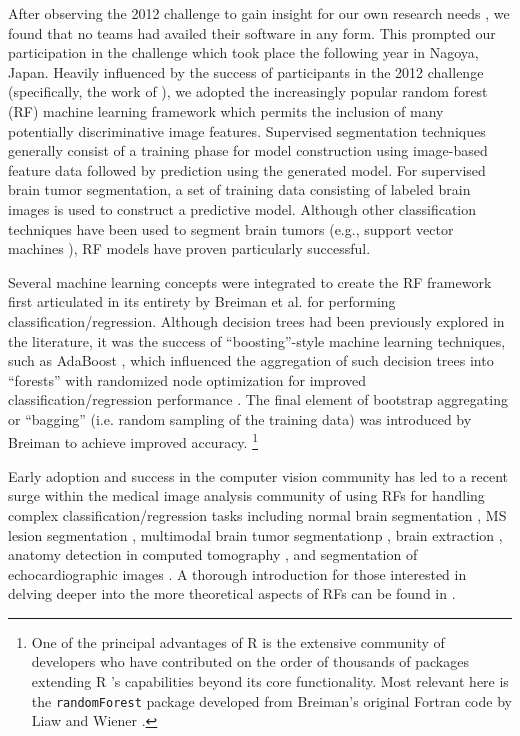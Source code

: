 \documentclass[preprint,authoryear,review,12pt]{elsarticle}
\begin{document}
After observing the 2012 challenge to gain insight for our own research 
needs \citep{durst2014}, we found that no teams had availed their software in any 
form.  This prompted our participation in the challenge which took place
the following year in Nagoya, Japan.  Heavily influenced by the success 
of participants in the 2012 challenge (specifically, the work of 
\cite{bauer2012,geremia2012,zikic2012}), we adopted the increasingly popular 
random forest (RF) machine learning framework \citep{breiman2001} which 
permits the inclusion of many potentially discriminative image features.  
Supervised segmentation techniques generally consist of a training phase
for model construction using image-based feature data followed by prediction using the 
generated model.  For supervised brain tumor segmentation, 
a set of training data consisting of labeled brain images 
is used to construct a predictive model.  Although other 
classification techniques have been used to segment
brain tumors (e.g., support vector machines \citep{bauer2011}),
RF models have proven particularly successful.

Several machine learning concepts were integrated to create 
the RF framework first articulated in its entirety by Breiman
et al. \citep{breiman2001} for performing classification/regression.  
Although decision trees had been previously explored in the literature, 
it was the success of ``boosting''-style machine learning 
techniques, such as AdaBoost \citep{schapire1990,freund1997}, which influenced 
the aggregation of such decision trees into ``forests'' 
with randomized node optimization for improved
classification/regression performance \citep{ho1995,amit1997}.
The final element of bootstrap aggregating or ``bagging'' (i.e.
random sampling of the training data) was
introduced by Breiman \citep{breiman1996} to achieve improved
accuracy.%
\footnote{
One of the principal advantages of R is the extensive community of
developers  who have contributed on the order of thousands of packages 
extending R 's capabilities beyond its core functionality.
Most relevant here
is the {\tt randomForest} package developed from Breiman's original
Fortran code by Liaw and Wiener \citep{liaw2002}.
}

Early adoption \cite{viola2005} and success in the
computer vision community
has led to a recent surge within the medical image analysis
community of using RFs for handling complex 
classification/regression tasks including
normal brain segmentation \citep{yi2009},
MS lesion segmentation \cite{geremia2011}, 
multimodal brain tumor segmentationp
\citep{bauer2012,zikic2012}, brain extraction \citep{iglesias2010}, 
anatomy detection in computed tomography \citep{criminisi2013}, and
segmentation of echocardiographic images \citep{verhoek2011}. 
A thorough introduction for those interested in delving deeper 
into the more theoretical aspects of RFs can be found
in \cite{criminisi2011}.
\end{document}
